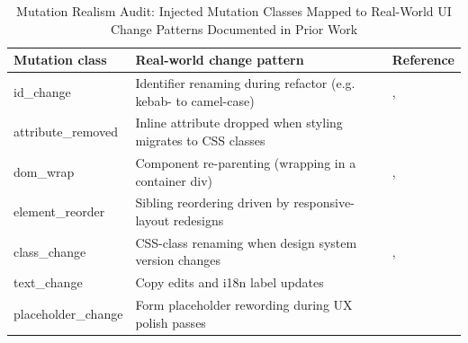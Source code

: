 \begin{table}[H]
\centering
\caption{Mutation Realism Audit: Injected Mutation Classes Mapped to Real-World UI Change Patterns Documented in Prior Work}
\label{tab:mutation_realism}
\begin{tabular}{p{}p{}p{}}
\toprule
Mutation class & Real-world change pattern & Reference \\
\midrule
id\_change & Identifier renaming during refactor (e.g. kebab- to camel-case) & \cite{hammoudi2016}, \cite{stocco2018} \\
attribute\_removed & Inline attribute dropped when styling migrates to CSS classes & \cite{hammoudi2016} \\
dom\_wrap & Component re-parenting (wrapping in a container div) & \cite{yandrapally2014}, \cite{ricca2019} \\
element\_reorder & Sibling reordering driven by responsive-layout redesigns & \cite{yandrapally2014} \\
class\_change & CSS-class renaming when design system version changes & \cite{hammoudi2016}, \cite{stocco2018} \\
text\_change & Copy edits and i18n label updates & \cite{ricca2019} \\
placeholder\_change & Form placeholder rewording during UX polish passes & \cite{hammoudi2016} \\
\bottomrule
\end{tabular}
\end{table}
